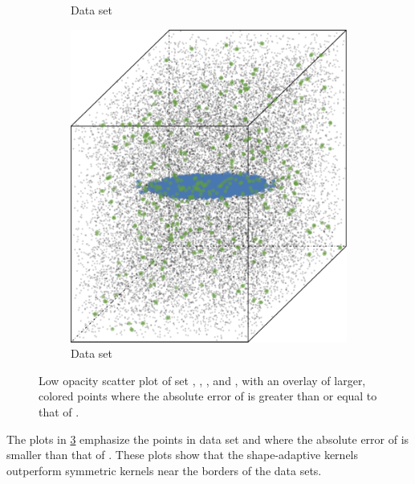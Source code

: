 \begin{figure}
\begin{subfigure}{0.23\textwidth}
				\caption{Data set \baakmanFour}
				\label{fig:discussion:performance:mbeLowerError:baakman4}
			\end{subfigure}
			\begin{subfigure}{0.23\textwidth}
				\centering
				\includegraphics[keepaspectratio=true, width=\textwidth, height=0.23\textheight]{discussion/img/baakman_5_abs_error_mbeSmallerThansambe}
				\caption{Data set \baakmanFive}
				\label{fig:discussion:performance:mbeLowerError:baakman5}
			\end{subfigure}
			\caption{Low opacity scatter plot of set %
				 \ferdosiOne, %
				 \baakmanOne, %
				 \baakmanFour, and %
				 \baakmanFive, %
				with an overlay of larger, colored points where the absolute error of \sambe is greater than or equal to that of \mbe.}
			\label{fig:discussion:performance:singleSphere:mbeLowerError}
		\end{figure}
		The plots in \cref{fig:discussion:performance:singleSphere:mbeLowerError} emphasize the points in data set \ferdosiOne and \baakmanOne where the absolute error of \mbe is smaller than that of \sambe. These plots show that the shape-adaptive kernels outperform symmetric kernels near the borders of the data sets.
